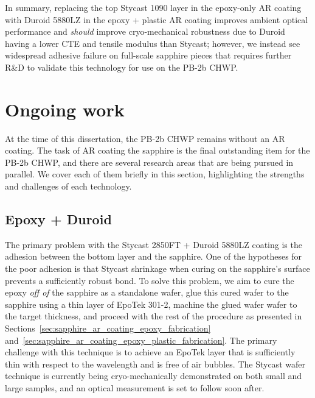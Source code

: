 In summary, replacing the top Stycast 1090 layer in the epoxy-only AR coating with Duroid 5880LZ in the epoxy + plastic AR coating improves ambient optical performance and \textit{should} improve cryo-mechanical robustness due to Duroid having a lower CTE and tensile modulus than Stycast; however, we instead see widespread adhesive failure on full-scale sapphire pieces that requires further R\&D to validate this technology for use on the PB-2b CHWP.


\section{Ongoing work}
\label{sec:sapphire_ar_coating_ongoing_work}

At the time of this dissertation, the PB-2b CHWP remains without an AR coating. The task of AR coating the sapphire is the final outstanding item for the PB-2b CHWP, and there are several research areas that are being pursued in parallel. We cover each of them briefly in this section, highlighting the strengths and challenges of each technology.


\subsection{Epoxy + Duroid}
\label{sec:sapphire_ar_coating_ongoin_work_epoxy_duroid}

The primary problem with the Stycast 2850FT + Duroid 5880LZ coating is the adhesion between the bottom layer and the sapphire. One of the hypotheses for the poor adhesion is that Stycast shrinkage when curing on the sapphire's surface prevents a sufficiently robust bond. To solve this problem, we aim to cure the epoxy \textit{off of} the sapphire as a standalone wafer, glue this cured wafer to the sapphire using a thin layer of EpoTek 301-2, machine the glued wafer wafer to the target thickness, and proceed with the rest of the procedure as presented in Sections~\ref{sec:sapphire_ar_coating_epoxy_fabrication} and~\ref{sec:sapphire_ar_coating_epoxy_plastic_fabrication}. The primary challenge with this technique is to achieve an EpoTek layer that is sufficiently thin with respect to the wavelength and is free of air bubbles. The Stycast wafer technique is currently being cryo-mechanically demonstrated on both small and large samples, and an optical measurement is set to follow soon after.

